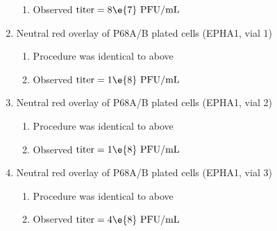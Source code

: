 \begin{enumerate}
\begin{enumerate}
			\item Observed $\text{titer}=8\e{7}\text{ PFU/mL}$
		\end{enumerate}
	\item Neutral red overlay of P68A/B plated cells (EPHA1, vial 1)
		\begin{enumerate}
			\item Procedure was identical to above
			\item Observed $\text{titer}=1\e{8}\text{ PFU/mL}$
		\end{enumerate}
	\item Neutral red overlay of P68A/B plated cells (EPHA1, vial 2)
		\begin{enumerate}
			\item Procedure was identical to above
			\item Observed $\text{titer}=1\e{8}\text{ PFU/mL}$
		\end{enumerate}
	\item Neutral red overlay of P68A/B plated cells (EPHA1, vial 3)
		\begin{enumerate}
			\item Procedure was identical to above
			\item Observed $\text{titer}=4\e{8}\text{ PFU/mL}$
		\end{enumerate}
\end{enumerate}